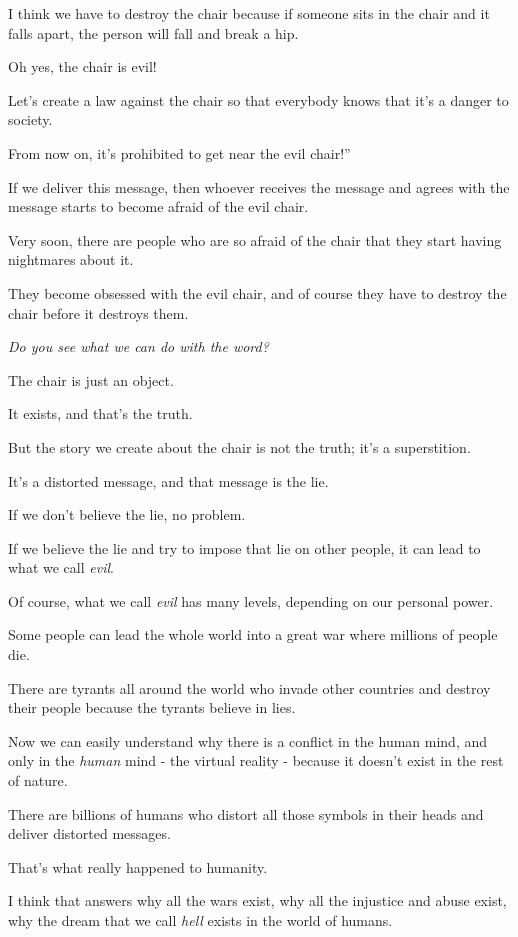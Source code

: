 \documentclass{article}
\numberwithin{equation}{section}
\begin{document}
I think we have to destroy the chair because if someone sits in the chair and it falls apart, the person will fall and break a hip.

Oh yes, the chair is evil!

Let's create a law against the chair so that everybody knows that it's a danger to society.

From now on, it's prohibited to get near the evil chair!''

%
If we deliver this message, then whoever receives the message and agrees with the message starts to become afraid of the evil chair.

Very soon, there are people who are so afraid of the chair that they start having nightmares about it.

They become obsessed with the evil chair, and of course they have to destroy the chair before it destroys them.

%
\textit{Do you see what we can do with the word?}

The chair is just an object.

It exists, and that's the truth.

But the story we create about the chair is not the truth; it's a superstition.

It's a distorted message, and that message is the lie.

If we don't believe the lie, no problem.

If we believe the lie and try to impose that lie on other people, it can lead to what we call \textit{evil}.

Of course, what we call \textit{evil} has many levels, depending on our personal power.

Some people can lead the whole world into a great war where millions of people die.

There are tyrants all around the world who invade other countries and destroy their people because the tyrants believe in lies.

%
Now we can easily understand why there is a conflict in the human mind, and only in the \textit{human} mind - the virtual reality - because it doesn't exist in the rest of nature.

There are billions of humans who distort all those symbols in their heads and deliver distorted messages.

That's what really happened to humanity.

I think that answers why all the wars exist, why all the injustice and abuse exist, why the dream that we call \textit{hell} exists in the world of humans.
\end{document}
